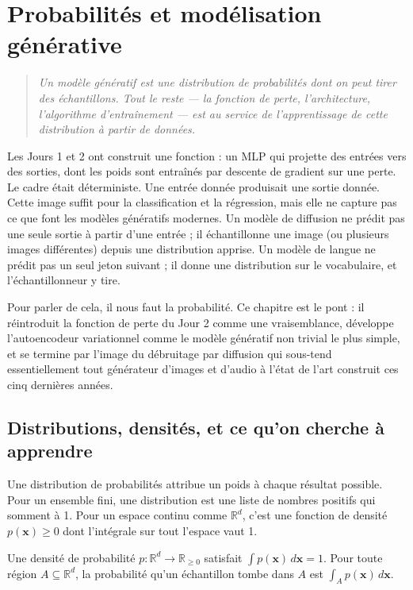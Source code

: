 \chapter{Probabilités et modélisation générative}
\label{ch:jour3}

\begin{quote}
\emph{\og Un modèle génératif est une distribution de probabilités dont on peut tirer des échantillons. Tout le reste --- la fonction de perte, l'architecture, l'algorithme d'entraînement --- est au service de l'apprentissage de cette distribution à partir de données. \fg}
\end{quote}

Les Jours 1 et 2 ont construit une fonction : un MLP qui projette des entrées vers des sorties, dont les poids sont entraînés par descente de gradient sur une perte. Le cadre était déterministe. Une entrée donnée produisait une sortie donnée. Cette image suffit pour la classification et la régression, mais elle ne capture pas ce que font les modèles génératifs modernes. Un modèle de diffusion ne prédit pas une seule sortie à partir d'une entrée ; il échantillonne une image (ou plusieurs images différentes) depuis une distribution apprise. Un modèle de langue ne prédit pas un seul jeton suivant ; il donne une distribution sur le vocabulaire, et l'échantillonneur y tire.

Pour parler de cela, il nous faut la probabilité. Ce chapitre est le pont : il réintroduit la fonction de perte du Jour 2 comme une vraisemblance, développe l'autoencodeur variationnel comme le modèle génératif non trivial le plus simple, et se termine par l'image du débruitage par diffusion qui sous-tend essentiellement tout générateur d'images et d'audio à l'état de l'art construit ces cinq dernières années.

\section{Distributions, densités, et ce qu'on cherche à apprendre}

Une distribution de probabilités attribue un poids à chaque résultat possible. Pour un ensemble fini, une distribution est une liste de nombres positifs qui somment à 1. Pour un espace continu comme $\mathbb{R}^d$, c'est une fonction de densité $p(\bm{x}) \geq 0$ dont l'intégrale sur tout l'espace vaut 1.

\begin{definition}[Densité]
Une densité de probabilité $p: \mathbb{R}^d \to \mathbb{R}_{\geq 0}$ satisfait $\int p(\bm{x}) \, d\bm{x} = 1$. Pour toute région $A \subseteq \mathbb{R}^d$, la probabilité qu'un échantillon tombe dans $A$ est $\int_A p(\bm{x}) \, d\bm{x}$.
\end{definition}

